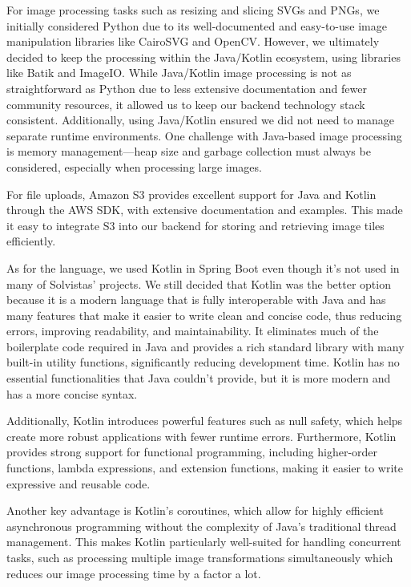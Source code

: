 For image processing tasks such as resizing and slicing SVGs and PNGs, we initially considered Python due to its well-documented and easy-to-use image manipulation libraries like CairoSVG and OpenCV. However, we ultimately decided to keep the processing within the Java/Kotlin ecosystem, using libraries like Batik and ImageIO. While Java/Kotlin image processing is not as straightforward as Python due to less extensive documentation and fewer community resources, it allowed us to keep our backend technology stack consistent. Additionally, using Java/Kotlin ensured we did not need to manage separate runtime environments. One challenge with Java-based image processing is memory management—heap size and garbage collection must always be considered, especially when processing large images.

For file uploads, Amazon S3 provides excellent support for Java and Kotlin through the AWS SDK, with extensive documentation and examples. This made it easy to integrate S3 into our backend for storing and retrieving image tiles efficiently.

As for the language, we used Kotlin in Spring Boot even though it’s not used in many of Solvistas’ projects. We still decided that Kotlin was the better option because it is a modern language that is fully interoperable with Java and has many features that make it easier to write clean and concise code, thus reducing errors, improving readability, and maintainability. It eliminates much of the boilerplate code required in Java and provides a rich standard library with many built-in utility functions, significantly reducing development time. Kotlin has no essential functionalities that Java couldn’t provide, but it is more modern and has a more concise syntax.

Additionally, Kotlin introduces powerful features such as null safety, which helps create more robust applications with fewer runtime errors. Furthermore, Kotlin provides strong support for functional programming, including higher-order functions, lambda expressions, and extension functions, making it easier to write expressive and reusable code.

Another key advantage is Kotlin’s coroutines, which allow for highly efficient asynchronous programming without the complexity of Java’s traditional thread management. This makes Kotlin particularly well-suited for handling concurrent tasks, such as processing multiple image transformations simultaneously which reduces our image processing time by a factor a lot.

